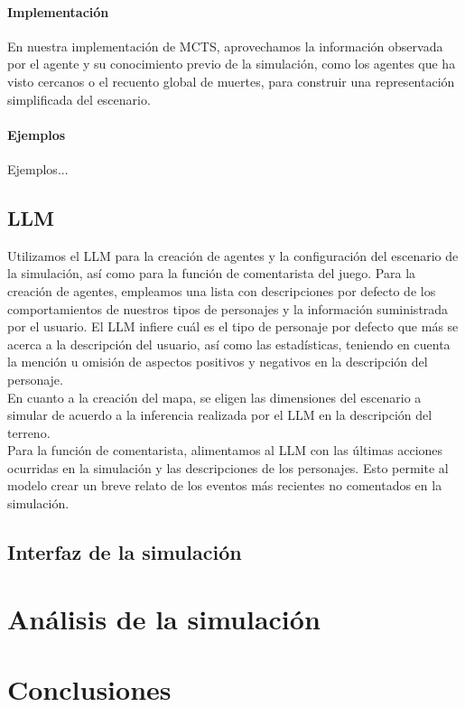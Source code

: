 \documentclass[11pt]{article}
\begin{document}
\paragraph{Implementación}
En nuestra implementación de MCTS, aprovechamos la información observada por el agente y su conocimiento previo de la simulación, como los agentes que ha visto cercanos o el recuento global de muertes, para construir una representación simplificada del escenario.

\paragraph{Ejemplos}
Ejemplos...



\subsection{LLM}
Utilizamos el LLM para la creación de agentes y la configuración del escenario de la simulación, así como para la función de comentarista del juego. Para la creación de agentes, empleamos una lista con descripciones por defecto de los comportamientos de nuestros tipos de personajes y la información suministrada por el usuario. El LLM infiere cuál es el tipo de personaje por defecto que más se acerca a la descripción del usuario, así como las estadísticas, teniendo en cuenta la mención u omisión de aspectos positivos y negativos en la descripción del personaje.
\\
En cuanto a la creación del mapa, se eligen las dimensiones del escenario a simular de acuerdo a la inferencia realizada por el LLM en la descripción del terreno.  \\
Para la función de comentarista, alimentamos al LLM con las últimas acciones ocurridas en la simulación y las descripciones de los personajes. Esto permite al modelo crear un breve relato de los eventos más recientes no comentados en la simulación.
\subsection{Interfaz de la simulación}

\section{Análisis de la simulación}
\section{Conclusiones}
\end{document}
